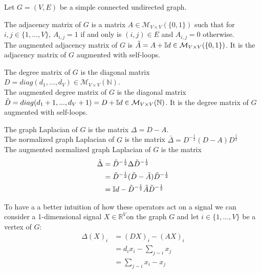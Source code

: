 \documentclass[12pt]{article}
\begin{document}
Let $G = (V, E)$ be a simple connected undirected graph.

\begin{definition}
    The adjacency matrix of $G$ is a matrix $A \in \mathcal{M}_{V \times V}(\{0,1\})$ such that for $i,j \in \{1,...,V\}$, $A_{i,j} = 1$ if and only is $(i,j) \in E$ and $A_{i,j} = 0$ otherwise.\\
    
    The augmented adjacency matrix of $G$ is $\Tilde{A} = A + \mathbb{I}d \in \mathcal{M}_{V \times V}(\{0,1\})$. It is the adjacency matrix of $G$ augmented with self-loops.
\end{definition}

\begin{definition}
    The degree matrix of $G$ is the diagonal matrix $D=diag(d_1,...,d_V) \in \mathcal{M}_{V \times V}(\mathbb{N})$.\\
    
    The augmented degree matrix of $G$ is the diagonal matrix  $\Tilde{D}= diag(d_1+1,...,d_V+1) = D + \mathbb{I}d \in \mathcal{M}_{V \times V}(\mathbb{N})$. It is the degree matrix of $G$ augmented with self-loops.
\end{definition}

\begin{definition}
    The graph Laplacian of $G$ is the matrix $\Delta = D - A$.\\

    The normalized graph Laplacian of $G$ is the matrix $\bar{\Delta} = D^{-\frac{1}{2}}(D - A)D^{\frac{1}{2}}$\\
    
    The augmented normalized graph Laplacian of $G$ is the matrix
    \begin{align*}
        \Tilde{\Delta} &= \Tilde{D}^{-\frac{1}{2}} \Delta \Tilde{D}^{-\frac{1}{2}} \\
        &= \Tilde{D}^{-\frac{1}{2}}(\Tilde{D} - \Tilde{A}) \Tilde{D}^{-\frac{1}{2}} \\
        &= \mathbb{I}d - \Tilde{D}^{-\frac{1}{2}}\Tilde{A} \Tilde{D}^{-\frac{1}{2}}
    \end{align*}
\end{definition}

To have a a better intuition of how these operators act on a signal we can
consider a 1-dimensional signal $X \in \mathbb{R}^V$on the graph $G$ and let $i \in \{1,...,V\}$ be a vertex of $G$:
\begin{align*}
    \Delta(X)_i &= (DX)_i - (AX)_i \\
                &= d_i x_i - \sum_{j \sim i} x_j \\
                &= \sum_{j \sim i} x_i - x_j
\end{align*}
\end{document}
